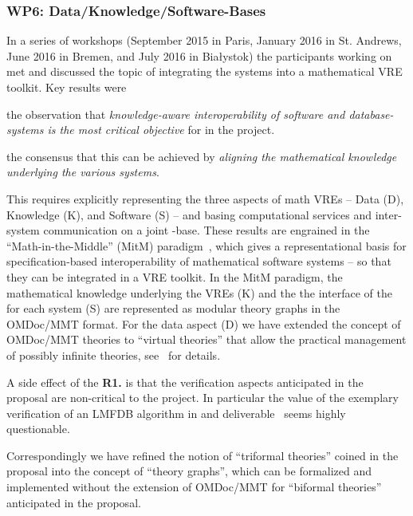 \documentclass{deliverablereport}
\begin{document}
\subsubsection{WP6: Data/Knowledge/Software-Bases }

In a series of workshops (September 2015 in Paris, January 2016 in
St. Andrews, June 2016 in Bremen, and July 2016 in Bia{\l}ystok) the
participants working on  met and discussed the topic
of integrating the \pn systems into a mathematical VRE toolkit.  Key
results were
\begin{compactitem}[\bf R1.]
\item the observation that \emph{knowledge-aware interoperability of
    software and database-systems is the most critical objective} for
   in the \pn project.
\item the consensus that this can be achieved by \emph{aligning the
    mathematical knowledge underlying the various systems}.
\end{compactitem}
This requires explicitly representing the three aspects of math VREs
-- Data (D), Knowledge (K), and Software (S) -- and basing
computational services and inter-system communication on a joint
\DKS-base. These results are engrained in the ``Math-in-the-Middle''
(MitM) paradigm~\cite{DehKohKon:iop16}, which gives a representational
basis for specification-based interoperability of mathematical
software systems -- so that they can be integrated in a VRE
toolkit. In the MitM paradigm, the mathematical knowledge underlying
the VREs (K) and the the interface of the for each system (S) are
represented as modular theory graphs in the OMDoc/MMT format. For the
data aspect (D) we have extended the concept of OMDoc/MMT theories to
``virtual theories'' that allow the practical management of possibly
infinite theories, see~\cite{ODK-D6.2} for details.

A side effect of the \textbf{R1.} is that the verification aspects
anticipated in the proposal are non-critical to the \pn project. In
particular the value of the exemplary verification of an LMFDB
algorithm in  and
deliverable~ seems highly questionable.

Correspondingly we have refined the notion of ``triformal theories''
coined in the proposal into the concept of ``\DKS theory graphs'',
which can be formalized and implemented without the extension of
OMDoc/MMT for ``biformal theories'' anticipated in the proposal.
\end{document}
